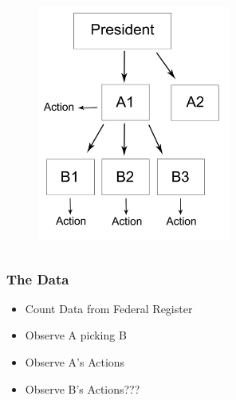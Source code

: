 \documentclass{beamer}
\begin{document}
\begin{frame}
\centering
\begin{figure}
\includegraphics[height=3.25in,width=2.5in]{ModelV3.pdf}
\end{figure}
\end{frame}

\begin{frame}
\frametitle{The Data}
\begin{itemize} \addtolength{\itemsep}{1\baselineskip}
\item Count Data from Federal Register
\item Observe A picking B
\item Observe A's Actions
\item Observe B's Actions???
\end{itemize}
\end{frame}
\end{document}
